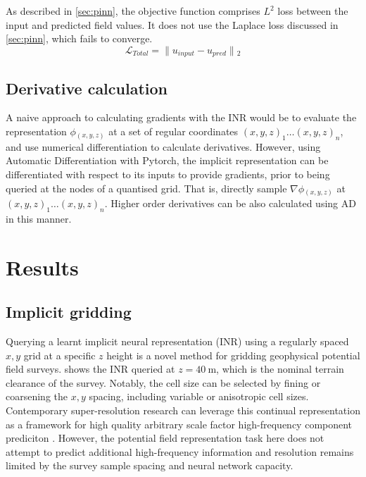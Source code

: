 \documentclass[manuscript.tex]{subfiles}
\begin{document}
As described in \cref{sec:pinn}, the objective function comprises \(L^2\) loss between the input and predicted field values.
It does not use the Laplace loss discussed in \cref{sec:pinn}, which fails to converge. %
\begin{equation}
    \label{eqn:cri}
    \mathcal{L}_{Total} = \lVert{}u_{input} - u_{pred}\rVert{}_{2} %
\end{equation}

\subsection{Derivative calculation}
A naive approach to calculating gradients with the INR would be to evaluate the representation \(\phi{}_{(x, y, z)}\) at a set of regular coordinates \({(x, y, z)}_1 \dots {(x,y,z)}_n\), and use numerical differentiation to calculate derivatives.
However, using Automatic Differentiation with Pytorch, the implicit representation can be differentiated with respect to its inputs to provide gradients, prior to being queried at the nodes of a quantised grid.
That is, directly sample \(\nabla{}\phi{}_{(x,y,z)}\) at \({(x, y, z)}_1 \dots {(x,y,z)}_n\).
Higher order derivatives can be also calculated using AD in this manner.

\section{Results}
\subsection{Implicit gridding}
Querying a learnt implicit neural representation (INR) using a regularly spaced \(x,y\) grid at a specific \(z\) height is a novel method for gridding geophysical potential field surveys.
 shows the INR queried at \(z=\SI{40}{\meter}\), which is the nominal terrain clearance of the survey.
Notably, the cell size can be selected by fining or coarsening the \(x,y\) spacing, including variable or anisotropic cell sizes.
Contemporary super-resolution research can leverage this continual representation as a framework for high quality arbitrary scale factor high-frequency component prediciton \parencite[e.g][]{chenLearningContinuousImage2021}.
However, the potential field representation task here does not attempt to predict additional high-frequency information and resolution remains limited by the survey sample spacing and neural network capacity.
\end{document}
